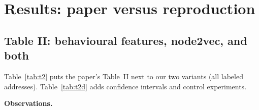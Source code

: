 \documentclass[11pt,a4paper]{article}
\begin{document}
\section{Results: paper versus reproduction}
\label{sec:results}
\subsection{Table II: behavioural features, node2vec, and both}
\label{sec:t2}
Table~\ref{tab:t2} puts the paper's Table~II next to our two variants (all \NumLabeled{} labeled addresses). Table~\ref{tab:t2d} adds confidence intervals and control experiments.
\begin{table}[H]
\centering\footnotesize

\caption{Precision (P), recall (R) and F$_1$ at threshold 0.5. Paper values are from its Table~II. Variant A: labeled addresses are in the core; variant B: labeled addresses receive propagated embeddings only.}
\label{tab:t2}
\end{table}
\begin{table}[H]
\centering\scriptsize
\setlength{\tabcolsep}{3pt}
\caption{F$_1$ and PR-AUC with 95\% confidence intervals over 5 splits. ``Flag removed'' drops the has-embedding indicator; ``covered only'' keeps only addresses that have an embedding; ``no miners'' drops miners from the good class (481 bad, 127 good).}
\label{tab:t2d}
\end{table}
\textbf{Observations.}
\end{document}
